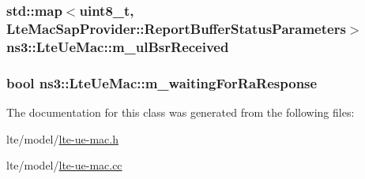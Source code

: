 \subsubsection[{\texorpdfstring{m\+\_\+ul\+Bsr\+Received}{m_ulBsrReceived}}]{\setlength{\rightskip}{0pt plus 5cm}std\+::map$<$uint8\+\_\+t, {\bf Lte\+Mac\+Sap\+Provider\+::\+Report\+Buffer\+Status\+Parameters}$>$ ns3\+::\+Lte\+Ue\+Mac\+::m\+\_\+ul\+Bsr\+Received\hspace{0.3cm}{\ttfamily [private]}}\hypertarget{classns3_1_1LteUeMac_ab1de37ecba7b76c9de1dd81bf49ac66d}{}\label{classns3_1_1LteUeMac_ab1de37ecba7b76c9de1dd81bf49ac66d}
\subsubsection[{\texorpdfstring{m\+\_\+waiting\+For\+Ra\+Response}{m_waitingForRaResponse}}]{\setlength{\rightskip}{0pt plus 5cm}bool ns3\+::\+Lte\+Ue\+Mac\+::m\+\_\+waiting\+For\+Ra\+Response\hspace{0.3cm}{\ttfamily [private]}}\hypertarget{classns3_1_1LteUeMac_ad31e6d5654f49c13d6f5614922e97288}{}\label{classns3_1_1LteUeMac_ad31e6d5654f49c13d6f5614922e97288}


The documentation for this class was generated from the following files\+:\begin{DoxyCompactItemize}
\item 
lte/model/\hyperlink{lte-ue-mac_8h}{lte-\/ue-\/mac.\+h}\item 
lte/model/\hyperlink{lte-ue-mac_8cc}{lte-\/ue-\/mac.\+cc}\end{DoxyCompactItemize}
